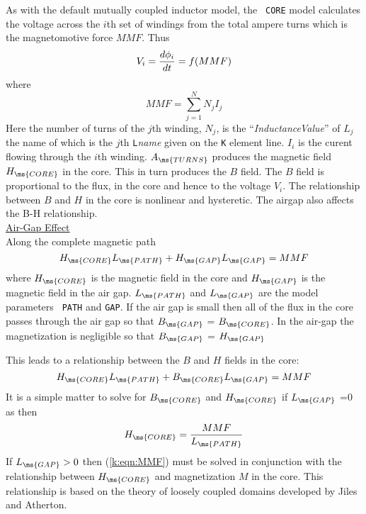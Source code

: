 As with the default mutually coupled inductor model, the {\tt
CORE} model calculates the voltage across the $i$th set of
windings from the total ampere turns which is the magnetomotive
force $MMF$. Thus
\begin{equation}
V_i = {{\textstyle d \phi_i } \over {\textstyle d t}} = f( MMF )
\end{equation}
where
\begin{equation}
MMF = \sum_{j=1}^N N_j I_j
\end{equation}
Here the number of turns of the $j$th winding, $N_j$, is the
``{\it InductanceValue}'' of $L_j$ the name of which is the $j$th
{\tt L}{\it name} given on the {\tt K} element line. $I_i$ is the
curent flowing through the $i$th winding. $A_{\ms{TURNS}}$
produces the magnetic field $H_{\ms{CORE}}$ in the core. This in
turn produces the $B$ field. The $B$ field is proportional to the
flux, in the core and hence to the voltage $V_i$. The relationship
between $B$ and $H$ in the core is nonlinear
and hysteretic. The airgap also affects the B-H relationship.\\[0.1in]
\noindent\underline{Air-Gap Effect}\\[0.1in]
Along the complete magnetic path
\begin{equation}
H_{\ms{CORE}} L_{\ms{PATH}} + H_{\ms{GAP}} L_{\ms{GAP}} = MMF
\end{equation}
where $H_{\ms{CORE}}$ is the magnetic field in the core and
$H_{\ms{GAP}}$ is the magnetic field in the air gap.
$L_{\ms{PATH}}$ and $L_{\ms{GAP}}$ are the model parameters {\tt
PATH} and {\tt GAP}. If the air gap is small then  all of the flux
in the core passes through the air gap so that $B_{\ms{GAP}}$ =
$B_{\ms{CORE}}$. In the air-gap the magnetization is negligible so
that $B_{\ms{GAP}}$ = $H_{\ms{GAP}}$

This leads to a relationship between the $B$ and $H$ fields in the
core:
\begin{equation}
H_{\ms{CORE}} L_{\ms{PATH}} + B_{\ms{CORE}} L_{\ms{GAP}} = MMF
\label{k:eqn:MMF}
\end{equation}
It is a simple matter to solve for $B_{\ms{CORE}}$ and
$H_{\ms{CORE}}$ if $L_{\ms{GAP}}$ =0 as then
\begin{equation}
H_{\ms{CORE}} = {{MMF} \over {L_{\ms{PATH}}}}
\end{equation}
If $L_{\ms{GAP}} > 0$ then (\ref{k:eqn:MMF}) must be solved in
conjunction with the relationship between $H_{\ms{CORE}}$ and
magnetization $M$ in the core. This relationship is based on the
theory of loosely coupled domains developed by Jiles and Atherton.

